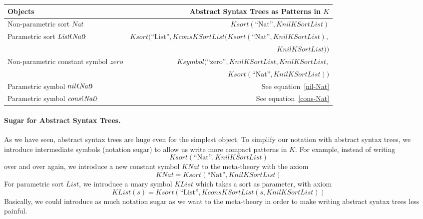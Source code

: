 \documentclass[UTF8,11pt]{article}
\theoremstyle{plain}
\theoremstyle{definition}
\theoremstyle{remark}
\newcommand{\Nat}{\textit{Nat}}
\newcommand{\KNat}{\textit{KNat}}
\newcommand{\List}{\textit{List}}
\newcommand{\KList}{\textit{KList}}
\newcommand{\cons}{\textit{cons}}
\newcommand{\parametric}[2]{{#1}\raisebox{.2ex}{\texttt{\footnotesize{\{}}}#2\raisebox{.2ex}{\texttt{\footnotesize{\}}}}}
\newcommand{\zero}{\textit{zero}}
\newcommand{\Ksort}{\mathit{Ksort}}
\newcommand{\Ksymbol}{\mathit{Ksymbol}}
\newcommand{\KnilKSortList}{\mathit{KnilKSortList}}
\newcommand{\KconsKSortList}{\mathit{KconsKSortList}}
\begin{document}
\begin{center}
	\begin{tabular}{l|r}
		\textbf{Objects} & \textbf{Abstract Syntax Trees as Patterns in $K$}
		\\\hline
		Non-parametric sort $\Nat$ & $\Ksort(\text{``Nat''}, \KnilKSortList)$
		\\\hline
		Parametric sort $\parametric{\List}{\Nat}$ & $\Ksort(\text{``List''}, \KconsKSortList(\Ksort(\text{``Nat''}, \KnilKSortList),$ \\ & $\KnilKSortList))$
		\\\hline
		Non-parametric constant symbol $\zero$ & $\Ksymbol(\text{``zero''}, \KnilKSortList, \KnilKSortList,$ \\ &
		$\Ksort(\text{``Nat''}, \KnilKSortList))$
		\\\hline
		Parametric symbol $\parametric{nil}{\Nat}$ & See equation~\eqref{nil-Nat}
		\\\hline
		Parametric symbol $\parametric{\cons}{\Nat}$ & See equation~\eqref{cons-Nat}
	\end{tabular}
\end{center}

\paragraph{Sugar for Abstract Syntax Trees.}
As we have seen, abstract syntax trees are huge even for the simplest object.
To simplify our notation with abstract syntax trees, we introduce intermediate symbols (notation sugar) to allow us write more compact patterns in $K$.
For example, instead of writing
$$\Ksort(\text{``Nat''}, \KnilKSortList)$$
over and over again, we introduce a new constant symbol $\KNat$ to the meta-theory with the axiom
$$ \KNat = \Ksort(\text{``Nat''}, \KnilKSortList) $$
For parametric sort $\List$, we introduce a unary symbol $\KList$ which takes a sort as parameter, with axiom
$$ \KList(s) = \Ksort(\text{``List''}, \KconsKSortList(s, \KnilKSortList)) $$
Basically, we could introduce as much notation sugar as we want to the meta-theory in order to make writing abstract syntax trees less painful.
\end{document}
